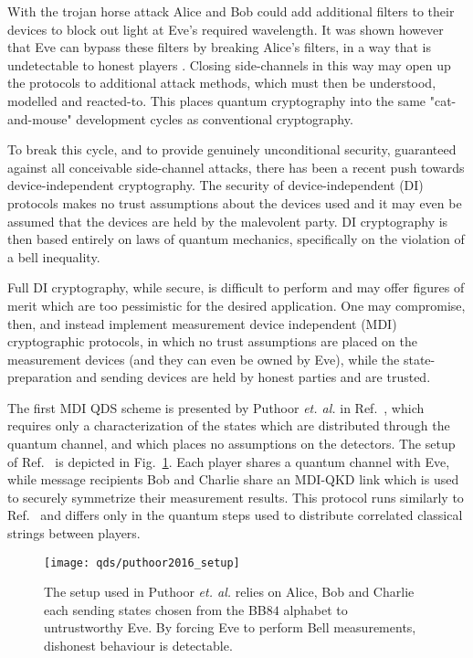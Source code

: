 With the trojan horse attack Alice and Bob could add additional filters to their devices to block out light at Eve's required wavelength. It was shown however that Eve can bypass these filters by breaking Alice's filters, in a way that is undetectable to honest players . Closing side-channels in this way may open up the protocols to additional attack methods, which must then be understood, modelled and reacted-to. This places quantum cryptography into the same "cat-and-mouse" development cycles as conventional cryptography. 

To break this cycle, and to provide genuinely unconditional security, guaranteed against all conceivable side-channel attacks, there has been a recent push towards device-independent cryptography. The security of device-independent (DI) protocols makes no trust assumptions about the devices used and it may even be assumed that the  devices are held by the malevolent party. DI cryptography is then based entirely on laws of quantum mechanics, specifically on the violation of a bell inequality. 

Full DI cryptography, while secure, is difficult to perform and may offer figures of merit which are too pessimistic for the desired application. One may compromise, then, and instead implement measurement device independent (MDI) cryptographic protocols, in which no trust assumptions are placed on the measurement devices (and they can even be owned by Eve), while the state-preparation and sending devices are held by honest parties and are trusted. 

The first MDI QDS scheme is presented by Puthoor \emph{et. al.} in Ref.~\cite{Puthoor2016}, which requires only a characterization of the states which are distributed through the quantum channel, and which places no assumptions on the detectors. The setup of Ref.~\cite{Puthoor2016} is depicted in Fig.~\ref{fig:puthoor2016_setup}. Each player shares a quantum channel with Eve, while message recipients Bob and Charlie share an MDI-QKD link which is used to securely symmetrize their measurement results. This protocol runs similarly to Ref.~\cite{Amiri2016} and differs only in the quantum steps used to distribute correlated classical strings between players. 

\begin{figure}[htp]
\centering
\texttt{[image: qds/puthoor2016\_setup]}
\caption{\label{fig:puthoor2016_setup} The setup used in Puthoor \emph{et. al.} \cite{Puthoor2016} relies on Alice, Bob and Charlie each sending states chosen from the BB$84$ alphabet to untrustworthy Eve. By forcing Eve to perform Bell measurements, dishonest behaviour is detectable.}
\end{figure}

